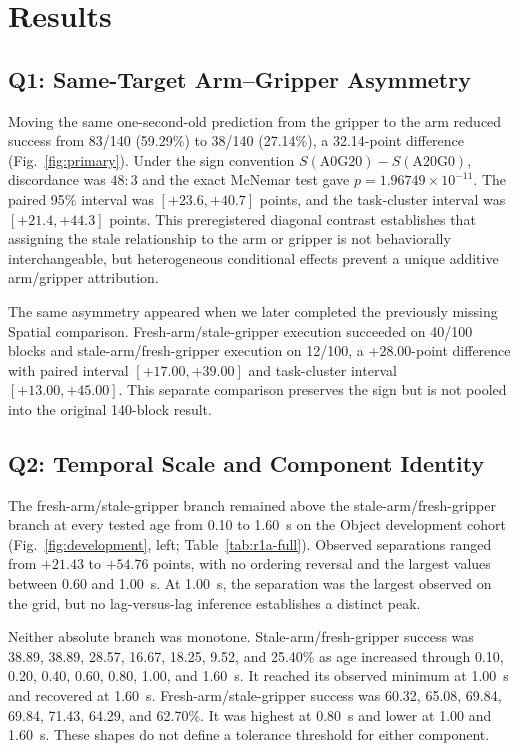 \section{Results}
\label{sec:results}



\subsection{Q1: Same-Target Arm--Gripper Asymmetry}

Moving the same one-second-old prediction from the gripper to the arm reduced
success from 83/140 (59.29\%) to 38/140 (27.14\%), a 32.14-point difference
(Fig.~\ref{fig:primary}). Under the sign convention
$S(\mathrm{A0G20})-S(\mathrm{A20G0})$, discordance was $48{:}3$ and the exact
McNemar test gave $p=1.96749\times10^{-11}$. The paired 95\% interval was
$[+23.6,+40.7]$ points, and the task-cluster interval was
$[+21.4,+44.3]$ points. This preregistered diagonal contrast establishes that
assigning the stale relationship to the arm or gripper is not behaviorally
interchangeable, but heterogeneous conditional effects prevent a unique
additive arm/gripper attribution.

The same asymmetry appeared when we later completed the previously missing
Spatial comparison. Fresh-arm/stale-gripper execution succeeded on 40/100
blocks and stale-arm/fresh-gripper execution on 12/100, a $+28.00$-point
difference with paired interval $[+17.00,+39.00]$ and task-cluster interval
$[+13.00,+45.00]$. This separate comparison preserves the sign but is not
pooled into the original 140-block result.



\subsection{Q2: Temporal Scale and Component Identity}

The fresh-arm/stale-gripper branch remained above the stale-arm/fresh-gripper
branch at every tested age from 0.10 to 1.60~s on the Object development
cohort (Fig.~\ref{fig:development}, left; Table~\ref{tab:r1a-full}). Observed separations ranged from
$+21.43$ to $+54.76$ points, with no ordering reversal and the largest values
between 0.60 and 1.00~s. At 1.00~s, the separation was the largest observed on
the grid, but no lag-versus-lag inference establishes a distinct peak.

Neither absolute branch was monotone. Stale-arm/fresh-gripper success was
38.89, 38.89, 28.57, 16.67, 18.25, 9.52, and 25.40\% as age increased through
0.10, 0.20, 0.40, 0.60, 0.80, 1.00, and 1.60~s. It reached its observed
minimum at 1.00~s and recovered at 1.60~s. Fresh-arm/stale-gripper success was
60.32, 65.08, 69.84, 69.84, 71.43, 64.29, and 62.70\%. It was highest at
0.80~s and lower at 1.00 and 1.60~s. These shapes do not define a tolerance
threshold for either component.

